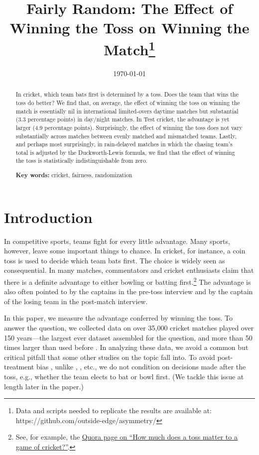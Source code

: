 \documentclass[12pt, letterpaper]{article}
\title{Fairly Random: The Effect of Winning the Toss on Winning the Match\thanks{Data and scripts needed to replicate the results are available at: https://github.com/outside-edge/asymmetry/}}
\date{\today}
\begin{document}
\maketitle
\doublespacing

\begin{abstract}

In cricket, which team bats first is determined by a toss. Does the team that wins the toss do better? We find that, on average, the effect of winning the toss on winning the match is essentially nil in international limited-overs daytime matches but substantial (3.3 percentage points) in day/night matches. In Test cricket, the advantage is yet larger (4.9 percentage points). Surprisingly, the effect of winning the toss does not vary substantially across matches between evenly matched and mismatched teams. Lastly, and perhaps most surprisingly, in rain-delayed matches in which the chasing team's total is adjusted by the Duckworth-Lewis formula, we find that the effect of winning the toss is statistically indistinguishable from zero.

\smallskip

\textbf{Key words:} cricket, fairness, randomization

\end{abstract}

\section{Introduction}

In competitive sports, teams fight for every little advantage. Many sports, however, leave some important things to chance. In cricket, for instance, a coin toss is used to decide which team bats first. The choice is widely seen as consequential. In many matches, commentators and cricket enthusiasts claim that there is a definite advantage to either bowling or batting first.\footnote{See, for example, the \href{https://www.quora.com/How-much-does-a-toss-matter-to-a-game-of-cricket}{Quora page on ``How much does a toss matter to a game of cricket?''}.} The advantage is also often pointed to by the captains in the pre-toss interview and by the captain of the losing team in the post-match interview.

In this paper, we measure the advantage conferred by winning the toss. To answer the question, we collected data on over 35,000 cricket matches played over 150 years---the largest ever dataset assembled for the question, and more than 50 times larger than used before \citep[see,][]{dawson2009bat, de1998winning}. In analyzing these data, we avoid a common but critical pitfall that some other studies on the topic fall into. To avoid post-treatment bias \citep[see][]{acharya2015}, unlike \citet{dawson2009bat}, \citet{Saad2015}, etc., we do not condition on decisions made after the toss, e.g., whether the team elects to bat or bowl first. (We tackle this issue at length later in the paper.)
\end{document}
